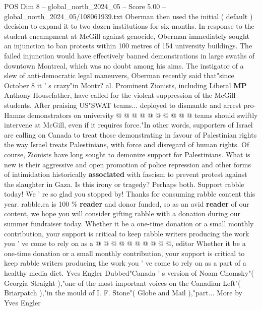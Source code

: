 \begin{textsample}{POS Dim 8 – global\_north\_2024\_05 – Score 5.00 – global\_north\_2024\_05/108061939.txt}
Oberman then used the initial ( default ) decision to expand it to two dozen institutions for six months.
In response to the student encampment at McGill against genocide, Oberman immediately sought an injunction to ban protests within 100 metres of 154 university buildings.
The failed injunction would have effectively banned demonstrations in large swaths of downtown Montreal, which was no doubt among his aims.
The instigator of a slew of anti-democratic legal maneuvers, Oberman recently said that"since October 8 it ' s crazy"in Montr? al.
Prominent Zionists, including Liberal \textbf{MP} Anthony Housefather, have called for the violent suppression of the McGill students.
After praising US"SWAT teams... deployed to dismantle and arrest pro-Hamas demonstrators on university @ @ @ @ @ @ @ @ @ @ teams should swiftly intervene at McGill, even if it requires force."In other words, supporters of Israel are calling on Canada to treat those demonstrating in favour of Palestinian rights the way Israel treats Palestinians, with force and disregard of human rights.
Of course, Zionists have long sought to demonize support for Palestinians.
What is new is their aggressive and open promotion of police repression and other forms of intimidation historically \textbf{associated} with fascism to prevent protest against the slaughter in Gaza.
Is this irony or tragedy?
Perhaps both.
Support rabble today!
We ' re so glad you stopped by!
Thanks for consuming rabble content this year. rabble.ca is 100 \% \textbf{reader} and donor funded, so as an avid \textbf{reader} of our content, we hope you will consider gifting rabble with a donation during our summer fundraiser today.
Whether it be a one-time donation or a small monthly contribution, your support is critical to keep rabble writers producing the work you ' ve come to rely on as a @ @ @ @ @ @ @ @ @ @, editor Whether it be a one-time donation or a small monthly contribution, your support is critical to keep rabble writers producing the work you ' ve come to rely on as a part of a healthy media diet.
Yves Engler Dubbed"Canada ' s version of Noam Chomsky"( Georgia Straight ),"one of the most important voices on the Canadian Left"( Briarpatch ),"in the mould of I.
F.
Stone"( Globe and Mail ),"part...
More by Yves Engler

\end{textsample}
